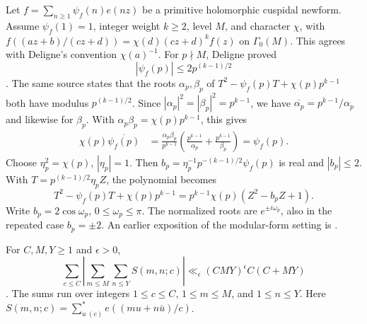 \begin{fact}\label{fact:F4-deligne}\label{fact:F5-deligne}
Let $f=\sum_{n\ge1}\psi_f(n)e(nz)$ be a primitive holomorphic cuspidal newform.
Assume $\psi_f(1)=1$, integer weight $k\ge2$, level $M$, and character $\chi$,
with $f((az+b)/(cz+d))=\chi(d)(cz+d)^kf(z)$ on $\Gamma_0(M)$.
This agrees with Deligne's convention $\chi(a)^{-1}$.
For $p\nmid M$, Deligne proved
\begin{equation}\label{eq:deligne-roots}
 |\psi_f(p)|\le2p^{(k-1)/2}
\end{equation}
\cite[Th\'eor\`eme~(8.2), p.~302]{Deligne1974}.
The same source states that the roots $\alpha_p,\beta_p$ of
$T^2-\psi_f(p)T+\chi(p)p^{k-1}$ both have modulus $p^{(k-1)/2}$.
Since $|\alpha_p|^2=|\beta_p|^2=p^{k-1}$, we have
$\overline{\alpha_p}=p^{k-1}/\alpha_p$ and likewise for $\beta_p$.
With $\alpha_p\beta_p=\chi(p)p^{k-1}$, this gives
\begin{equation}\label{eq:deligne-conjugation}
 \begin{aligned}
 \chi(p)\overline{\psi_f(p)}
 &=\frac{\alpha_p\beta_p}{p^{k-1}}
   \left(\frac{p^{k-1}}{\alpha_p}+\frac{p^{k-1}}{\beta_p}\right)
 =\psi_f(p).
 \end{aligned}
\end{equation}
Choose $\eta_p^2=\chi(p)$, $|\eta_p|=1$.
Then $b_p=\eta_p^{-1}p^{-(k-1)/2}\psi_f(p)$ is real and $|b_p|\le2$.
With $T=p^{(k-1)/2}\eta_p Z$, the polynomial becomes
\[
 T^2-\psi_f(p)T+\chi(p)p^{k-1}
       =p^{k-1}\chi(p)(Z^2-b_pZ+1).
\]
Write $b_p=2\cos\omega_p$, $0\le\omega_p\le\pi$.
The normalized roots are $e^{\pm i\omega_p}$,
also in the repeated case $b_p=\pm2$.
An earlier exposition of the modular-form setting is
\cite{DeligneBourbaki1971}.
\end{fact}

\begin{fact}\label{fact:F5-di82-thm14}\label{fact:F2-di82-thm14}
For $C,M,Y\ge1$ and $\epsilon>0$,
\begin{equation}\label{eq:F2-di82-thm14}
 \sum_{c\le C}\left|\sum_{m\le M}\sum_{n\le Y}S(m,n;c)\right|
 \ll_\epsilon(CMY)^\epsilon C(C+MY)
\end{equation}
\cite[Theorem~14, equation~(8.13), p.~275]{DI82}.
The sums run over integers $1\le c\le C$, $1\le m\le M$,
and $1\le n\le Y$. Here $S(m,n;c)=\sum_{u\ (c)}^*e((mu+n\bar u)/c)$.
\end{fact}

